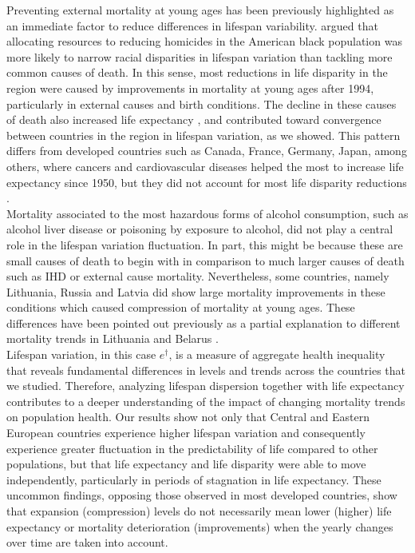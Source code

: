 \documentclass{article}
\begin{document}
\begin{spacing}{1.5}
Preventing external mortality at young ages has been previously highlighted as an immediate factor to reduce differences in lifespan variability. \citet{firebaugh2014lifespans} argued that allocating resources to reducing homicides in the American black population was more likely to narrow racial disparities in lifespan variation than tackling more common causes of death. In this sense, most reductions in life disparity in the region were caused by improvements in mortality at young ages after 1994, particularly in external causes and birth conditions. The decline in these causes of death also \textcolor[rgb]{1,0,0}{increased} life expectancy \citep{trias2017contribution}, and \textcolor[rgb]{1,0,0}{contributed toward} convergence between countries in the region in lifespan variation, as we showed. This pattern differs from developed countries such as Canada, France, Germany, Japan, among others, where cancers and cardiovascular diseases helped the most to increase life expectancy since 1950, but they did not account for most life disparity reductions \citep{seligman2016equity}.\\

Mortality associated to the most hazardous forms of alcohol consumption, such as alcohol liver disease or poisoning by exposure to alcohol, did not play a central role in the lifespan variation fluctuation. In part, this might be because these are small causes of death to begin with in comparison to much larger causes of death such as IHD or external cause mortality. Nevertheless, some countries, namely Lithuania, Russia and Latvia did show large mortality improvements in these conditions which caused compression of mortality at young ages. These differences have been pointed out previously as a partial explanation to different mortality trends in Lithuania and Belarus \citep{grigoriev2015spatial}.\\

Lifespan variation, in this case $e^\dagger$, is a measure of aggregate health inequality that reveals fundamental differences in levels and trends across the countries that we studied. Therefore, analyzing lifespan dispersion together with life expectancy contributes to a deeper understanding of the impact of changing mortality trends on population health. Our results show not only that Central and Eastern European countries experience higher lifespan variation and \textcolor[rgb]{1,0,0}{consequently experience} greater fluctuation in the predictability of life compared to other populations, but that life expectancy and life disparity were able to move independently, particularly in periods of stagnation in life expectancy. These uncommon findings, opposing those observed in most developed countries, show that expansion (compression) levels do not necessarily mean lower (higher) life expectancy  or mortality deterioration (improvements) when the yearly changes over time are taken into account. \\


\end{spacing}
\end{document}

